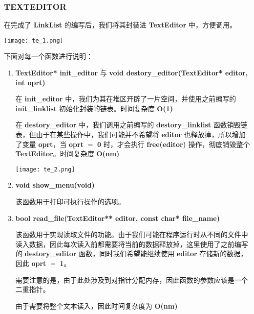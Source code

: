         \subsubsection{TEXTEDITOR}
            \par 在完成了 \textbf{LinkList} 的编写后，我们将其封装进 \textbf{TextEditor} 中，方便调用。
            \begin{figure*}[htbp]
                \texttt{[image: te\_1.png]}
            \end{figure*}
            \par 下面对每一个函数进行说明：
            \begin{enumerate}
                \item \textbf{TextEditor* init\_editor} 与 \textbf{void destory\_editor(TextEditor* editor, int oprt)}
                    \par 在 \textbf{init\_editor} 中，我们为其在堆区开辟了一片空间，并使用之前编写的 \textbf{init\_linklist} 初始化封装的链表。时间复杂度 \textbf{O(1)}
                    \par 在 \textbf{destory\_editor} 中，我们调用之前编写的 \textbf{destory\_linklist} 函数销毁链表，但由于在某些操作中，我们可能并不希望将 \textbf{editor} 也释放掉，所以增加了变量 \textbf{oprt}，当 \textbf{oprt} $=$ \textbf{0} 时，才会执行 \textbf{free(editor)} 操作，彻底销毁整个 \textbf{TextEditor}。时间复杂度 \textbf{O(nm)}
                    \begin{figure*}[htbp]
                        \texttt{[image: te\_2.png]}
                    \end{figure*}
                \item \textbf{void show\_menu(void)}
                    \par 该函数用于打印可执行操作的选项。
                \item \textbf{bool read\_file(TextEditor** editor, const char* file\_name)}
                    \par 该函数用于实现读取文件的功能。由于我们可能在程序运行时从不同的文件中读入数据，因此每次读入前都需要将当前的数据释放掉，这里使用了之前编写的 \textbf{destory\_editor} 函数，同时我们希望能继续使用 \textbf{editor} 存储新的数据，因此 \textbf{oprt} $=$ \textbf{1}。
                    \par 需要注意的是，由于此处涉及到对指针分配内存，因此函数的参数应该是一个二重指针。
                    \par 由于需要将整个文本读入，因此时间复杂度为 \textbf{O(nm)}
                    \begin{figure*}[htbp]

\end{figure*}
\end{enumerate}
